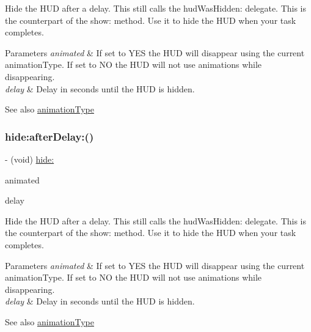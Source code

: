 Hide the H\+UD after a delay. This still calls the hud\+Was\+Hidden\+: delegate. This is the counterpart of the show\+: method. Use it to hide the H\+UD when your task completes.


\begin{DoxyParams}{Parameters}
{\em animated} & If set to Y\+ES the H\+UD will disappear using the current animation\+Type. If set to NO the H\+UD will not use animations while disappearing. \\
\hline
{\em delay} & Delay in seconds until the H\+UD is hidden.\\
\hline
\end{DoxyParams}
\begin{DoxySeeAlso}{See also}
\mbox{\hyperlink{interface_m_b_progress_h_u_d_a71d04bb9e2839df9377ad10d03b2e468}{animation\+Type}} 
\end{DoxySeeAlso}
\mbox{\label{interface_m_b_progress_h_u_d_a4181ac00f5f1ef95bcfab6749e1642e6}} 
\subsubsection{\texorpdfstring{hide\+:after\+Delay\+:()}{hide:afterDelay:()}\hspace{0.1cm}{\footnotesize\ttfamily [3/3]}}
{\footnotesize\ttfamily -\/ (void) \mbox{\hyperlink{interface_m_b_progress_h_u_d_a500fd79859e56cf98fd2eebfd37b4204}{hide\+:}} \begin{DoxyParamCaption}\item[{(B\+O\+OL)}]{animated }\item[{afterDelay:(N\+S\+Time\+Interval)}]{delay }\end{DoxyParamCaption}}

Hide the H\+UD after a delay. This still calls the hud\+Was\+Hidden\+: delegate. This is the counterpart of the show\+: method. Use it to hide the H\+UD when your task completes.


\begin{DoxyParams}{Parameters}
{\em animated} & If set to Y\+ES the H\+UD will disappear using the current animation\+Type. If set to NO the H\+UD will not use animations while disappearing. \\
\hline
{\em delay} & Delay in seconds until the H\+UD is hidden.\\
\hline
\end{DoxyParams}
\begin{DoxySeeAlso}{See also}
\mbox{\hyperlink{interface_m_b_progress_h_u_d_a71d04bb9e2839df9377ad10d03b2e468}{animation\+Type}} 
\end{DoxySeeAlso}
\mbox{\label{interface_m_b_progress_h_u_d_a24782426046cf6dda1534c2d27750454}} 
